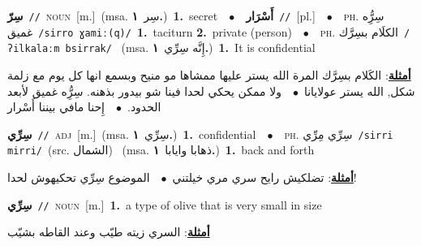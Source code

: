 \documentclass[10pt,a4paper,twoside]{article} %
\begin{document}
\begin{multicols}{2}
{\setlength\topsep{0pt}\textbf{\foreignlanguage{arabic}{سِرّ}}\ {\color{gray}\texttt{//}\color{black}}\ \textsc{noun}\ [m.]\ \color{gray}(msa. \foreignlanguage{arabic}{سِر}~\foreignlanguage{arabic}{\textbf{١.}})\color{black}\ \textbf{1.}~secret\ \ $\bullet$\ \ \setlength\topsep{0pt}\textbf{\foreignlanguage{arabic}{أَسْرَار}}\ {\color{gray}\texttt{//}\color{black}}\ [pl.]\ \ $\bullet$\ \ \textsc{ph.} \color{gray} \foreignlanguage{arabic}{سِرُِّه غميق}\color{black}\ {\color{gray}\texttt{/{\sffamily sirro ɣamiː(q)}/}\color{black}}\ \textbf{1.}~taciturn  \textbf{2.}~private (person)\ \ $\bullet$\ \ \textsc{ph.} \color{gray} \foreignlanguage{arabic}{الكلَام بسِرَّك}\color{black}\ {\color{gray}\texttt{/{\sffamily ʔilkalaːm bsirrak}/}\color{black}}\ \color{gray} (msa. \foreignlanguage{arabic}{إِنَّه سِرِّي}~\foreignlanguage{arabic}{\textbf{١.}})\color{black}\ \textbf{1.}~It is confidential\  \begin{flushright}\color{gray}\foreignlanguage{arabic}{\textbf{\underline{\foreignlanguage{arabic}{أمثلة}}}: الكَلام بسِرَّك المرة الله يستر عليها ممشاها مو منيح وبسمع انها كل يوم مع زلمة شكل, الله يستر عولايانا\ $\bullet$\ \  ولا ممكن يحكي لحدا فينا شو بيدور بذهنه. سِرُِّه غميق لأبعد الحدود.\ $\bullet$\ \  إِحنا مافي بيننا أَسْرار}\end{flushright}\color{black}} \vspace{2mm}

{\setlength\topsep{0pt}\textbf{\foreignlanguage{arabic}{سِرِّي}}\ {\color{gray}\texttt{//}\color{black}}\ \textsc{adj}\ [m.]\ \color{gray}(msa. \foreignlanguage{arabic}{سِرِّي}~\foreignlanguage{arabic}{\textbf{١.}})\color{black}\ \textbf{1.}~confidential\ \ $\bullet$\ \ \textsc{ph.} \color{gray} \foreignlanguage{arabic}{سِرِّي مِرِّي}\color{black}\ {\color{gray}\texttt{/{\sffamily sirri mirri}/}\color{black}}\ \color{gray}(src. \foreignlanguage{arabic}{الشمال})\color{black}\ \color{gray} (msa. \foreignlanguage{arabic}{ذهابا وايابا}~\foreignlanguage{arabic}{\textbf{١.}})\color{black}\ \textbf{1.}~back and forth\  \begin{flushright}\color{gray}\foreignlanguage{arabic}{\textbf{\underline{\foreignlanguage{arabic}{أمثلة}}}: تضلكيش رايح سري مري خيلتني\ $\bullet$\ \  الموضوع سِرِّي تحكيهوش لحدا!}\end{flushright}\color{black}} \vspace{2mm}

{\setlength\topsep{0pt}\textbf{\foreignlanguage{arabic}{سِرِّي}}\ {\color{gray}\texttt{//}\color{black}}\ \textsc{noun}\ [m.]\ \textbf{1.}~a type of olive that is very small in size\  \begin{flushright}\color{gray}\foreignlanguage{arabic}{\textbf{\underline{\foreignlanguage{arabic}{أمثلة}}}: السري زيته طيّب وعند القاطه بشيّب}\end{flushright}\color{black}} \vspace{2mm}


\end{multicols}
\end{document}
